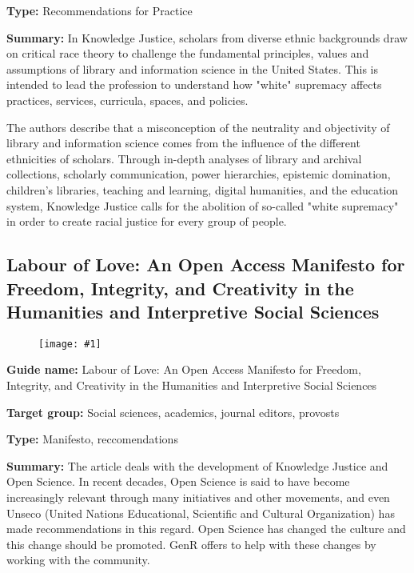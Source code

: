 \documentclass{article}
\newlength{\imgwidth}
\newcommand\scaledgraphics[2]{%
                
\settowidth{\imgwidth}{\texttt{[image: \#1]}}%
                
\setlength{\imgwidth}{\minof{\imgwidth}{#2\textwidth}}%
                
\texttt{[image: \#1]}%
                
}
\begin{document}
\textbf{Type:} Recommendations for Practice


\textbf{Summary: }In Knowledge Justice, scholars from diverse ethnic backgrounds draw on critical race theory to challenge the fundamental principles, values and assumptions of library and information science in the United States. This is intended to lead the profession to understand how "white" supremacy affects practices, services, curricula, spaces, and policies.


The authors describe that a misconception of the neutrality and objectivity of library and information science comes from the influence of the different ethnicities of scholars. Through in-depth analyses of library and archival collections, scholarly communication, power hierarchies, epistemic domination, children's libraries, teaching and learning, digital humanities, and the education system, Knowledge Justice calls for the abolition of so-called "white supremacy" in order to create racial justice for every group of people.


\subsection{Labour of Love: An Open Access Manifesto for Freedom, Integrity, and Creativity in the Humanities and Interpretive Social Sciences}\label{H4374482}



\begin{center}
\begin{figure}
\scaledgraphics{e590694e-3a8f-4a2f-801f-704d7d8edbc0.png}{0.75}
\label{F3873651}
\end{figure}


\end{center}


\textbf{Guide name: }Labour of Love: An Open Access Manifesto for Freedom, Integrity, and Creativity in the Humanities and Interpretive Social Sciences\textbf{ }\autocite{pia_labour_2020}


\textbf{Target group: }Social sciences, academics, journal editors, provosts


\textbf{Type:} Manifesto, reccomendations


\textbf{Summary:} The article deals with the development of Knowledge Justice and Open Science. In recent decades, Open Science is said to have become increasingly relevant through many initiatives and other movements, and even Unseco (United Nations Educational, Scientific and Cultural Organization) has made recommendations in this regard. Open Science has changed the culture and this change should be promoted. GenR offers to help with these changes by working with the community.
\end{document}
